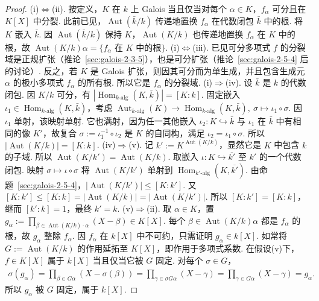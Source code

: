 \begin{proof}
(i)$\Leftrightarrow$(ii). 按定义，$K$ 在 $k$ 上 Galois 当且仅当对每个 $\alpha\in K$，$f_\alpha$ 可分且在 $K[X]$ 中分裂. 此前已见，$\operatorname{Aut}(\bar k/k)$ 传递地置换 $f_\alpha$ 在代数闭包 $\bar k$ 中的根. 将 $K$ 嵌入 $\bar k$. 因 $\operatorname{Aut}(\bar k/k)$ 保持 $K$，$\operatorname{Aut}(K/k)$ 也传递地置换 $f_\alpha$ 在 $K$ 中的根，故 $\operatorname{Aut}(K/k)\alpha=\{f_\alpha\text{ 在 }K\text{ 中的根}\}$.
(i)$\Leftrightarrow$(iii). 已见可分多项式 $f$ 的分裂域是正规扩张（推论~\ref{sec:galois-2-3-5}），也是可分扩张（推论~\ref{sec:galois-2-5-4} 后的讨论）. 反之，若 $K$ 是 Galois 扩张，则因其可分而为单生成，并且包含生成元 $\alpha$ 的极小多项式 $f_\alpha$ 的所有根. 所以它是 $f_\alpha$ 的分裂域.
(i)$\Rightarrow$(iv). 设 $\bar k$ 是 $k$ 的代数闭包. 因 $K/k$ 可分，有 $|\operatorname{Hom}_{k\text{-alg}}(K,\bar k)|=[K:k]$. 固定嵌入 $\iota_1\in\operatorname{Hom}_{k\text{-alg}}(K,\bar k)$，考虑 $\operatorname{Aut}_{k\text{-alg}}(K)\to\operatorname{Hom}_{k\text{-alg}}(K,\bar k),\ \sigma\mapsto\iota_1\circ\sigma$. 因 $\iota_1$ 单射，该映射单射. 它也满射，因为任一其他嵌入 $\iota_2:K\hookrightarrow\bar k$ 与 $\iota_1$ 在 $\bar k$ 中有相同的像 $K'$，故复合 $\sigma:=\iota_1^{-1}\circ\iota_2$ 是 $K$ 的自同构，满足 $\iota_2=\iota_1\circ\sigma$. 所以 $|\operatorname{Aut}(K/k)|=[K:k]$.
(iv)$\Rightarrow$(v). 记 $k':=K^{\operatorname{Aut}(K/k)}$，显然它是 $K$ 中包含 $k$ 的子域. 所以 $\operatorname{Aut}(K/k')=\operatorname{Aut}(K/k)$. 取嵌入 $\iota:K\hookrightarrow\overline{k'}$ 至 $k'$ 的一个代数闭包. 映射 $\sigma\mapsto\iota\circ\sigma$ 将 $\operatorname{Aut}(K/k')$ 单射到 $\operatorname{Hom}_{k'\text{-alg}}(K,\overline{k'})$. 由命题~\ref{sec:galois-2-5-4}，$|\operatorname{Aut}(K/k')|\leq[K:k']$. 又 $[K:k']\leq[K:k]=|\operatorname{Aut}(K/k)|=|\operatorname{Aut}(K/k')|$. 所以 $[K:k']=[K:k]$，继而 $[k':k]=1$，最终 $k'=k$.
(v)$\Rightarrow$(ii). 取 $\alpha\in K$，置 $g_\alpha:=\prod_{\beta\in\operatorname{Aut}(K/k)\cdot\alpha}(X-\beta)\in K[X]$. 每个 $\beta\in\operatorname{Aut}(K/k)\alpha$ 都是 $f_\alpha$ 的根，故 $g_\alpha$ 整除 $f_\alpha$. 因 $f_\alpha$ 在 $k[X]$ 中不可约，只需证明 $g_\alpha\in k[X]$. 如常将 $G:=\operatorname{Aut}(K/k)$ 的作用延拓至 $K[X]$，即作用于多项式系数. 在假设(v)下，$f\in K[X]$ 属于 $k[X]$ 当且仅当它被 $G$ 固定. 对每个 $\sigma\in G$，
\begin{align*}
\sigma(g_\alpha)=\prod_{\beta\in G\alpha}(X-\sigma(\beta))=\prod_{\gamma\in\sigma G\alpha}(X-\gamma)=\prod_{\gamma\in G\alpha}(X-\gamma)=g_\alpha.
\end{align*}
所以 $g_\alpha$ 被 $G$ 固定，属于 $k[X]$.
\end{proof}
